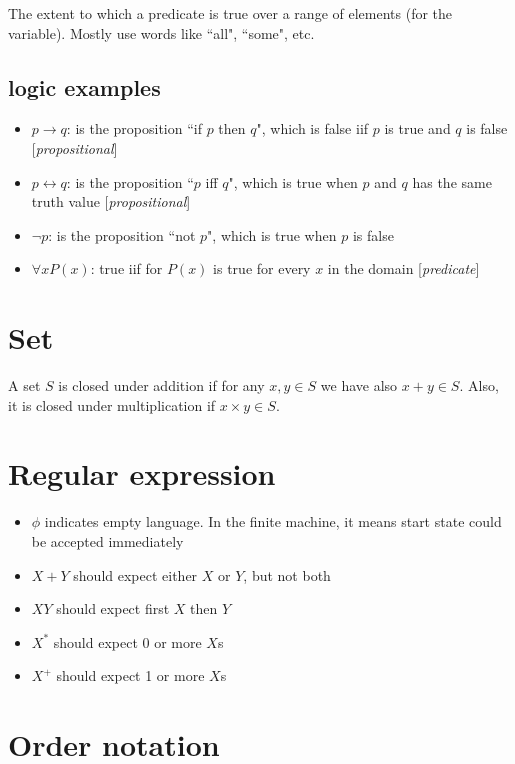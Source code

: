 \documentclass[11pt, oneside]{article}   	%
\begin{document}
The extent to which a predicate is true over a range of elements (for the variable). Mostly use words like ``all", ``some", etc.

\subsection{logic examples}

\begin{itemize}
\item $p \rightarrow q$: is the proposition ``if $p$ then $q$", which is false iif $p$ is true and $q$ is false [\textit{propositional}]
\item $p \leftrightarrow q$: is the proposition ``$p$ iff $q$", which is true when $p$ and $q$ has the same truth value [\textit{propositional}]
\item $\neg p$: is the proposition ``not $p$", which is true when $p$ is false
\item $\forall xP(x)$: true iif for $P(x)$ is true for every $x$ in the domain [\textit{predicate}]
\end{itemize}

\section{Set}

A set $S$ is closed under addition if for any $x,y \in S$ we have also $x+y \in S$. Also, it is closed under multiplication if $x \times y \in S$.

\section{Regular expression}

\begin{itemize}
\item $\phi$ indicates empty language. In the finite machine, it means start state could be accepted immediately
\item $X+Y$ should expect either $X$ or $Y$, but not both
\item $XY$ should expect first $X$ then $Y$
\item $X^*$ should expect 0 or more $X$s
\item $X^+$ should expect 1 or more $X$s
\end{itemize}

\section{Order notation}
\end{document}
